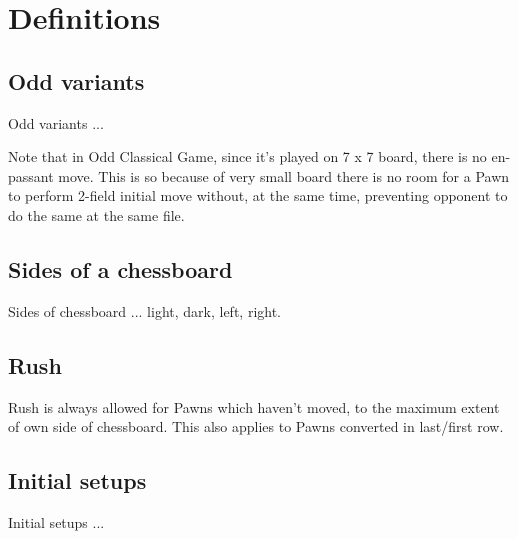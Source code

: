 

\chapter*{Definitions}
\label{ch:Definitions}

\section*{Odd variants}
\label{sec:Definitions/Odd variants}

Odd variants ...

Note that in Odd Classical Game, since it's played on 7 x 7 board,
there is no en-passant move. This is so because of very small board
there is no room for a Pawn to perform 2-field initial move without,
at the same time, preventing opponent to do the same at the same file.

\section*{Sides of a chessboard}
\label{sec:Definitions/Sides of a chessboard}

Sides of chessboard ... light, dark, left, right.

\section*{Rush}
\label{sec:Definitions/Rush}

Rush is always allowed for Pawns which haven't moved, to the maximum
extent of own side of chessboard. This also applies to Pawns converted
in last/first row.

\section*{Initial setups}
\label{sec:Definitions/Initial setups}
Initial setups ...


